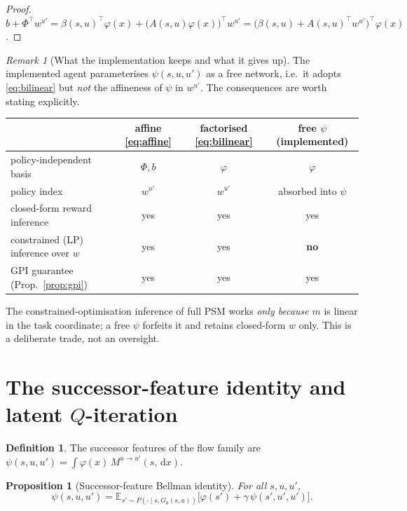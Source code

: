 \documentclass[11pt]{article}
\theoremstyle{plain}
\newtheorem{proposition}[lemma]{Proposition}
\theoremstyle{definition}
\newtheorem{definition}[lemma]{Definition}
\theoremstyle{remark}
\newtheorem{remark}[lemma]{Remark}
\newcommand{\E}{\mathbb E}
\newcommand{\1}{\mathbf 1}
\newcommand{\dd}{\,\mathrm d}
\newcommand{\Gth}{G_\theta}
\begin{document}
\begin{proof}
$b+\Phi^\top w^{u'}=\beta(s,u)^\top\varphi(x)+\big(A(s,u)\varphi(x)\big)^\top w^{u'}
=\big(\beta(s,u)+A(s,u)^\top w^{u'}\big)^\top\varphi(x)$.
\end{proof}

\begin{remark}[What the implementation keeps and what it gives up]
\label{rem:tradeoff}
The implemented agent parameterises $\psi(s,u,u')$ as a free network, i.e.\ it adopts
\eqref{eq:bilinear} but \emph{not} the affineness of $\psi$ in $w^{u'}$. The consequences
are worth stating explicitly.
\begin{center}
\begin{tabular}{lccc}
\toprule
 & affine \eqref{eq:affine} & factorised \eqref{eq:bilinear} & free $\psi$ (implemented) \\
\midrule
policy-independent basis        & $\Phi,b$        & $\varphi$      & $\varphi$ \\
policy index                    & $w^{u'}$        & $w^{u'}$       & absorbed into $\psi$ \\
closed-form reward inference    & yes             & yes            & yes \\
constrained (LP) inference over $w$ & yes         & yes            & \textbf{no} \\
GPI guarantee (Prop.~\ref{prop:gpi})& yes         & yes            & yes \\
\bottomrule
\end{tabular}
\end{center}
The constrained-optimisation inference of full PSM works \emph{only because} $m$ is linear
in the task coordinate; a free $\psi$ forfeits it and retains closed-form $w$ only. This is
a deliberate trade, not an oversight.
\end{remark}

\section{The successor-feature identity and latent \texorpdfstring{$Q$}{Q}-iteration}
\label{sec:sf}

\begin{definition}
\label{def:sf}
The successor features of the flow family are
$\psi(s,u,u')=\int\varphi(x)\,M^{u\to u'}(s,\dd x)$.
\end{definition}

\begin{proposition}[Successor-feature Bellman identity]
\label{prop:sf-identity}
For all $s,u,u'$,
\begin{equation}
\label{eq:sf-identity}
  \psi(s,u,u')=\E_{s'\sim P(\cdot\mid s,\Gth(s,u))}
  \Big[\varphi(s')+\gamma\,\psi(s',u',u')\Big].
\end{equation}
\end{proposition}
\end{document}
